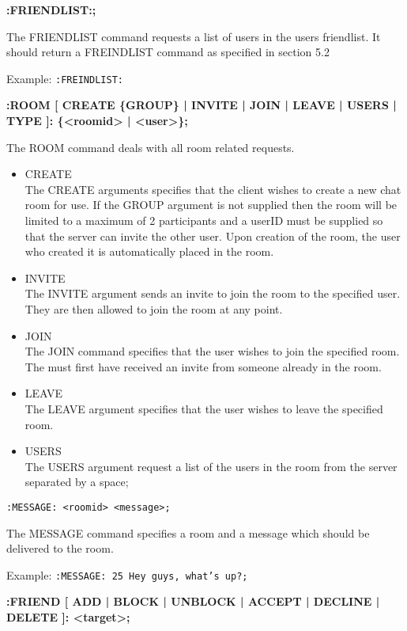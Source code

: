{\bf :FRIENDLIST:;}

The FRIENDLIST command requests a list of users in the users friendlist. It should return a FREINDLIST command as specified in section 5.2

Example:
\texttt{:FREINDLIST:} 
	
{\bf :ROOM [ CREATE \{GROUP\} | INVITE | JOIN | LEAVE | USERS | TYPE ]: \{<roomid> | <user>\};}

The ROOM command deals with all room related requests.

\begin{itemize}

\item{CREATE \\
The CREATE arguments specifies that the client wishes to create a new chat room for use. If the GROUP argument is not supplied then the room will be limited to a maximum of 2 participants and a userID must be supplied so that the server can invite the other user. Upon creation of the room, the user who created it is automatically placed in the room.}

\item {INVITE \\
The INVITE argument sends an invite to join the room to the specified user. They are then allowed to join the room at any point.}

\item{JOIN \\
The JOIN command specifies that the user wishes to join the specified room. The must first have received an invite from someone already in the room.}

\item{LEAVE \\
The LEAVE argument specifies that the user wishes to leave the specified room.}

\item{USERS \\
The USERS argument request a list of the users in the room from the server separated by a space;}

\end{itemize}

\texttt{:MESSAGE: <roomid> <message>;}

The MESSAGE command specifies a room and a message which should be delivered to the room.

Example:
\texttt{:MESSAGE: 25 Hey guys, what’s up?;}

{\bf :FRIEND [ ADD | BLOCK | UNBLOCK | ACCEPT | DECLINE | DELETE ]: <target>;}

